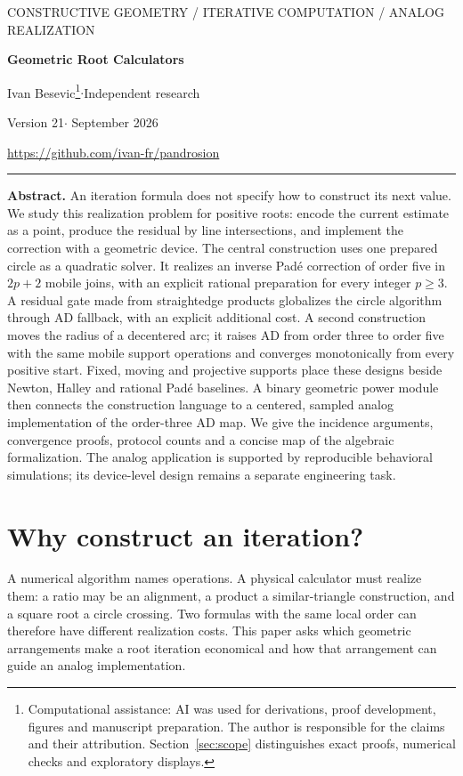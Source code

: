 \documentclass[11pt,a4paper]{article}
\begin{document}
\thispagestyle{empty}
{\small\sffamily\color{accent} CONSTRUCTIVE GEOMETRY / ITERATIVE COMPUTATION / ANALOG REALIZATION}\par
\vspace{8pt}
{\fontsize{24}{27}\selectfont\bfseries\color{ink} Geometric Root Calculators\par}
\vspace{5pt}{\large Fixed circles, moving supports, and analog realization}\par
\vspace{9pt}Ivan Besevic\footnote{Computational assistance: AI was used for derivations, proof development, figures and manuscript preparation. The author is responsible for the claims and their attribution. Section~\ref{sec:scope} distinguishes exact proofs, numerical checks and exploratory displays.}\quad$\cdot$\quad Independent research\par
{\small Version 21\quad$\cdot$ September 2026}\par
\url{https://github.com/ivan-fr/pandrosion}
\vspace{8pt}\hrule\vspace{8pt}
\textbf{Abstract.}
An iteration formula does not specify how to construct its next value. We study this realization problem for positive roots: encode the current estimate as a point, produce the residual by line intersections, and implement the correction with a geometric device. The central construction uses one prepared circle as a quadratic solver. It realizes an inverse Pad\'e correction of order five in $2p+2$ mobile joins, with an explicit rational preparation for every integer $p\ge3$. A residual gate made from straightedge products globalizes the circle algorithm through AD fallback, with an explicit additional cost. A second construction moves the radius of a decentered arc; it raises AD from order three to order five with the same mobile support operations and converges monotonically from every positive start. Fixed, moving and projective supports place these designs beside Newton, Halley and rational Pad\'e baselines. A binary geometric power module then connects the construction language to a centered, sampled analog implementation of the order-three AD map. We give the incidence arguments, convergence proofs, protocol counts and a concise map of the algebraic formalization. The analog application is supported by reproducible behavioral simulations; its device-level design remains a separate engineering task.

\section{Why construct an iteration?}
A numerical algorithm names operations. A physical calculator must realize them: a ratio may be an alignment, a product a similar-triangle construction, and a square root a circle crossing. Two formulas with the same local order can therefore have different realization costs. This paper asks which geometric arrangements make a root iteration economical and how that arrangement can guide an analog implementation.
\end{document}
